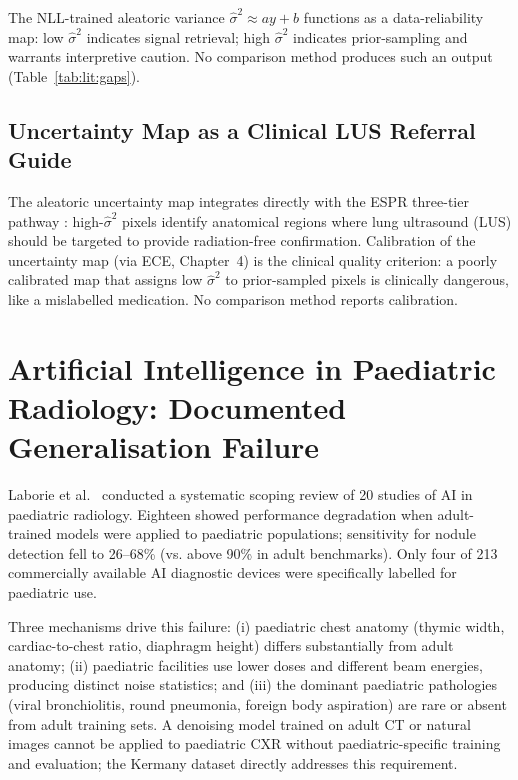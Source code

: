 \documentclass[12pt, a4paper, twoside, openright]{book}
\begin{document}
The NLL-trained aleatoric variance $\hat{\sigma}^2 \approx ay+b$ \cite{foi_practical_2008, kendall_what_2017} functions as a data-reliability map: low $\hat{\sigma}^2$ indicates signal retrieval; high $\hat{\sigma}^2$ indicates prior-sampling and warrants interpretive caution. No comparison method produces such an output (Table~\ref{tab:lit:gaps}).

\subsection{Uncertainty Map as a Clinical LUS Referral Guide}
\label{sec:lit:uncertainty:workflow}

The aleatoric uncertainty map integrates directly with the ESPR three-tier pathway \cite{lovrenski_esr_2025}: high-$\hat{\sigma}^2$ pixels identify anatomical regions where lung ultrasound (LUS) should be targeted to provide radiation-free confirmation. Calibration of the uncertainty map (via ECE, Chapter~4) is the clinical quality criterion: a poorly calibrated map that assigns low $\hat{\sigma}^2$ to prior-sampled pixels is clinically dangerous, like a mislabelled medication. No comparison method reports calibration.

\section{Artificial Intelligence in Paediatric Radiology: Documented Generalisation Failure}
\label{sec:lit:paediatric}

Laborie et al.\ \cite{laborie_scoping_2026} conducted a systematic scoping review of 20 studies of AI in paediatric radiology. Eighteen showed performance degradation when adult-trained models were applied to paediatric populations; sensitivity for nodule detection fell to 26--68\% (vs. above 90\% in adult benchmarks). Only four of 213 commercially available AI diagnostic devices were specifically labelled for paediatric use.

Three mechanisms drive this failure: (i) paediatric chest anatomy (thymic width, cardiac-to-chest ratio, diaphragm height) differs substantially from adult anatomy; (ii) paediatric facilities use lower doses and different beam energies, producing distinct noise statistics; and (iii) the dominant paediatric pathologies (viral bronchiolitis, round pneumonia, foreign body aspiration) are rare or absent from adult training sets. A denoising model trained on adult CT or natural images cannot be applied to paediatric CXR without paediatric-specific training and evaluation; the Kermany dataset directly addresses this requirement.
\end{document}
